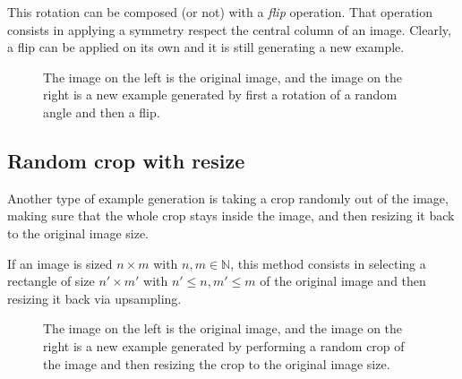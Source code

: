 This rotation can be composed (or not) with a \emph{flip} operation. That operation consists in applying a symmetry respect the central column of an image. Clearly, a flip can be applied on its own and it is still generating a new example.

\begin{figure}[htp] 
    \centering
    \hfill%
        \caption{The image on the left is the original image, and the image on the right is a new example generated by first a rotation of a random angle and then a flip.}
\end{figure}


\subsection*{Random crop with resize}

Another type of example generation is taking a crop randomly out of the image, making sure that the whole crop stays inside the image, and then resizing it back to the original image size. 

If an image is sized $n\times m$ with $n,m \in \mathbb N$, this method consists in selecting a rectangle of size $n'\times m'$ with $n' \leq n, m' \leq m$ of the original image and then resizing it back via upsampling\footnotemark.



\begin{figure}[htp] 
    \centering
    \hfill%
        \caption{The image on the left is the original image, and the image on the right is a new example generated by performing a random crop of the image and then resizing the crop to the original image size.}
\end{figure}

